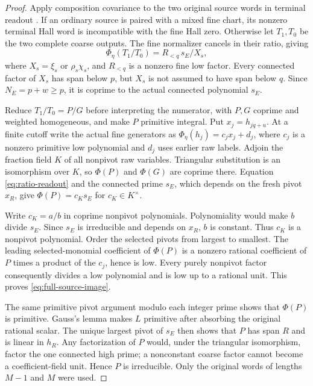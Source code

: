 \documentclass[11pt,a4paper]{amsart}
\numberwithin{equation}{section}
\theoremstyle{plain}
\theoremstyle{definition}
\begin{document}
\begin{proof}
Apply composition covariance to the two original source words in terminal
readout \cite[Composition covariance and terminal readout]{Shields2026Readout}.
If an ordinary source is paired with a mixed
fine chart, its nonzero terminal Hall word is incompatible with the fine
Hall zero.  Otherwise let \(T_1,T_0\) be the two complete coarse outputs.  The
fine normalizer cancels in their ratio, giving
\begin{equation}\label{eq:ratio-readout}
 \Phi_\eta(T_1/T_0)=R_{<q}\,s_E/X_s,
\end{equation}
where \(X_s=\xi_s\) or \(\rho_s\chi_s\), and \(R_{<q}\) is a nonzero fine low
factor.  Every connected factor of \(X_s\) has span below \(p\), but \(X_s\) is
not assumed to have span below \(q\).  Since \(N_E=p+w\ge p\), it is coprime to
the actual connected polynomial \(s_E\).

Reduce \(T_1/T_0=P/G\) before interpreting the numerator, with \(P,G\) coprime
and weighted homogeneous, and make \(P\) primitive integral.  Put
\(x_j=h_{jq+u}\).  At a finite cutoff write the actual fine generators as
\(\Phi_\eta(h_j)=c_jx_j+d_j\),
where \(c_j\) is a nonzero primitive low polynomial and \(d_j\) uses earlier
raw labels.  Adjoin the fraction field \(K\) of all nonpivot raw variables.
Triangular substitution is an isomorphism over \(K\), so \(\Phi(P)\) and
\(\Phi(G)\) are coprime there.  Equation \eqref{eq:ratio-readout} and the
connected prime \(s_E\), which depends on the fresh pivot \(x_R\), give
\(\Phi(P)=c_Ks_E\) for \(c_K\in K^\times\).

Write \(c_K=a/b\) in coprime nonpivot polynomials.  Polynomiality would make
\(b\) divide \(s_E\).  Since \(s_E\) is irreducible and depends on \(x_R\), \(b\) is
constant.  Thus \(c_K\) is a nonpivot polynomial.  Order the selected pivots
from largest to smallest.  The leading selected-monomial coefficient of
\(\Phi(P)\) is a nonzero rational coefficient of \(P\) times a product of the
\(c_j\), hence is low.  Every purely nonpivot factor consequently divides a
low polynomial and is low up to a rational unit.  This proves
\eqref{eq:full-source-image}.

The same primitive pivot argument modulo each integer prime shows that
\(\Phi(P)\) is primitive.  Gauss's lemma makes \(L\) primitive after absorbing
the original rational scalar.  The unique largest pivot of \(s_E\) then
shows that \(P\) has span \(R\) and is linear in \(h_R\).  Any factorization of
\(P\) would, under the triangular isomorphism, factor the one connected
high prime; a nonconstant coarse factor cannot become a coefficient-field
unit.  Hence \(P\) is irreducible.  Only the original words of lengths \(M-1\)
and \(M\) were used.
\end{proof}
\end{document}
